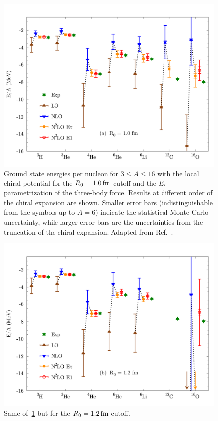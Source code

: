 \documentclass[aps,prc,twocolumn,superscriptaddress,floatfix]{revtex4-1}
\begin{document}
\begin{figure}[t]
\includegraphics[width=\linewidth]{ene_10.pdf}
\caption[]{Ground state energies per nucleon for $3\le A\le16$ with the local chiral potential 
for the $R_0=1.0\,\rm fm$ cutoff and the $E\tau$ parametrization of the three-body force. 
Results at different order of the chiral expansion are shown.
Smaller error bars (indistinguishable from the symbols up to $A=6$) 
indicate the statistical Monte Carlo uncertainty,
while larger error bars are the uncertainties from the truncation of
the chiral expansion. Adapted from Ref.~\cite{Lonardoni:2017afdmc}.}
\label{fig:ene_10}
\end{figure}

\begin{figure}[t]
\includegraphics[width=\linewidth]{ene_12.pdf}
\caption[]{Same of~\cref{fig:ene_10} but for the $R_0=1.2\,\rm fm$ cutoff.}
\label{fig:ene_12}
\end{figure}
\end{document}

